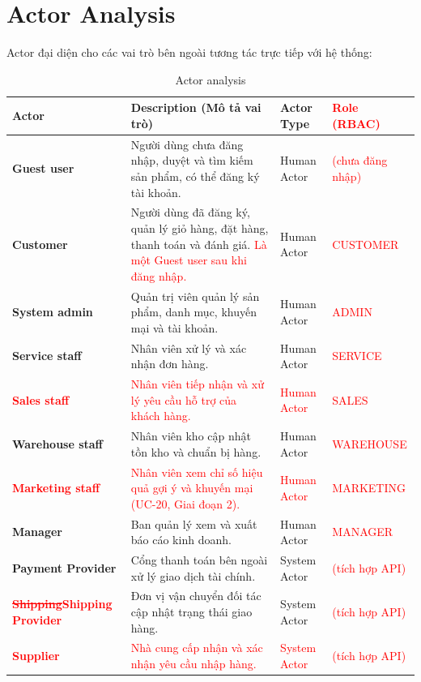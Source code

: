 \documentclass[12pt,a4paper,oneside]{report}
\newif\ifmark \marktrue
\newcommand{\chg}[1]{\ifmark\textcolor{red}{#1}\else #1\fi}
\newcommand{\del}[1]{\ifmark\textcolor{red}{\sout{#1}}\fi}
\begin{document}
\section{Actor Analysis}

Actor đại diện cho các vai trò bên ngoài tương tác trực tiếp với hệ thống:

\begin{longtable}{p{3.4cm}p{6.8cm}p{2.4cm}p{3.2cm}}
\caption{Actor analysis}\\
\toprule
\textbf{Actor} & \textbf{Description (Mô tả vai trò)} & \textbf{Actor Type} & \chg{\textbf{Role (RBAC)}} \\
\midrule
\endhead
\bottomrule
\endlastfoot
\textbf{Guest user} & Người dùng chưa đăng nhập, duyệt và tìm kiếm sản phẩm, có thể đăng ký tài khoản. & Human Actor & \chg{(chưa đăng nhập)} \\
\textbf{Customer} & Người dùng đã đăng ký, quản lý giỏ hàng, đặt hàng, thanh toán và đánh giá. \chg{Là một Guest user sau khi đăng nhập.} & Human Actor & \chg{CUSTOMER} \\
\textbf{System admin} & Quản trị viên quản lý sản phẩm, danh mục, khuyến mại và tài khoản. & Human Actor & \chg{ADMIN} \\
\textbf{Service staff} & Nhân viên xử lý và xác nhận đơn hàng. & Human Actor & \chg{SERVICE} \\
\chg{\textbf{Sales staff}} & \chg{Nhân viên tiếp nhận và xử lý yêu cầu hỗ trợ của khách hàng.} & \chg{Human Actor} & \chg{SALES} \\
\textbf{Warehouse staff} & Nhân viên kho cập nhật tồn kho và chuẩn bị hàng. & Human Actor & \chg{WAREHOUSE} \\
\chg{\textbf{Marketing staff}} & \chg{Nhân viên xem chỉ số hiệu quả gợi ý và khuyến mại (UC-20, Giai đoạn 2).} & \chg{Human Actor} & \chg{MARKETING} \\
\textbf{Manager} & Ban quản lý xem và xuất báo cáo kinh doanh. & Human Actor & \chg{MANAGER} \\
\textbf{Payment Provider} & Cổng thanh toán bên ngoài xử lý giao dịch tài chính. & System Actor & \chg{(tích hợp API)} \\
\textbf{\del{Shipping}\chg{Shipping Provider}} & Đơn vị vận chuyển đối tác cập nhật trạng thái giao hàng. & System Actor & \chg{(tích hợp API)} \\
\chg{\textbf{Supplier}} & \chg{Nhà cung cấp nhận và xác nhận yêu cầu nhập hàng.} & \chg{System Actor} & \chg{(tích hợp API)} \\
\end{longtable}
\end{document}
